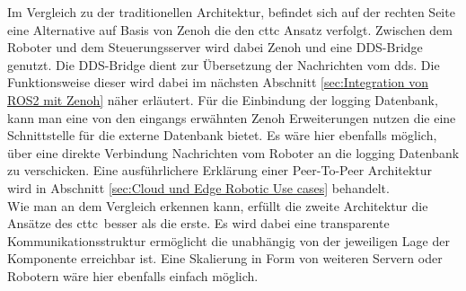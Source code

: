 Im Vergleich zu der traditionellen Architektur, befindet sich auf der rechten Seite eine Alternative auf Basis von Zenoh die den \acrlong{cttc} Ansatz verfolgt. Zwischen dem Roboter und dem Steuerungsserver wird dabei Zenoh und eine DDS-Bridge\cite{Eclipsezenoh} genutzt. Die DDS-Bridge dient zur Übersetzung der Nachrichten vom \acrlong{dds}. Die Funktionsweise dieser wird dabei im nächsten Abschnitt \ref{sec:Integration von ROS2 mit Zenoh} näher erläutert. Für die Einbindung der logging Datenbank, kann man eine von den eingangs erwähnten Zenoh Erweiterungen nutzen die eine Schnittstelle für die externe Datenbank bietet. Es wäre hier ebenfalls möglich, über eine direkte Verbindung Nachrichten vom Roboter an die logging Datenbank zu verschicken. Eine ausführlichere Erklärung einer Peer-To-Peer Architektur wird in Abschnitt \ref{sec:Cloud und Edge Robotic Use cases} behandelt.\\
Wie man an dem Vergleich erkennen kann, erfüllt die zweite Architektur die Ansätze des \acrlong{cttc} besser als die erste. Es wird dabei eine transparente Kommunikationsstruktur ermöglicht die unabhängig von der jeweiligen Lage der Komponente erreichbar ist. Eine Skalierung in Form von weiteren Servern oder Robotern wäre hier ebenfalls einfach möglich.

